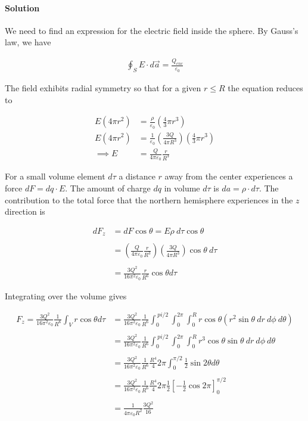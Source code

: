 \documentclass{article}
\begin{document}
\paragraph{Solution} We need to find an expression for the electric field inside the sphere. By Gauss's law, we have 

\begin{align*}
    \oint_S E\cdot d\vec{a} = \frac{Q_{enc}}{\varepsilon_0}
\end{align*}

The field exhibits radial symmetry so that for a given $r \leq R$ the equation reduces to 

\begin{align*}
    E(4\pi r^2) &= \frac{\rho}{\varepsilon_0}\left(\frac{4}{3}\pi r^3\right) \\
    E(4\pi r^2) &= \frac{1}{\varepsilon_0}\left(\frac{3Q}{4\pi R^3}\right)\left(\frac{4}{3}\pi r^3\right) \\
    \implies E &= \frac{Q}{4\pi\varepsilon_0}\frac{r}{R^3}
\end{align*}

For a small volume element $d\tau$ a distance $r$ away from the center experiences a force $dF = dq\cdot E$. The amount of charge $dq$ in volume $d\tau$ is $da = \rho\cdot d\tau$. The contribution to the total force that the northern hemisphere experiences in the $z$ direction is 

\begin{align*}
    dF_z &= dF\cos{\theta} = E\rho\ d\tau \cos{\theta} \\
    \\
    &= \left(\frac{Q}{4\pi\varepsilon_0}\frac{r}{R^3}\right)\left(\frac{3Q}{4\pi R^3}\right)\cos{\theta}\ d\tau\\
    \\
    &= \frac{3Q^2}{16\pi^2\varepsilon_0}\frac{r}{R^6}\cos{\theta}d\tau
\end{align*}

\pagebreak

Integrating over the volume gives 

\begin{align*}
    F_z = \frac{3Q^2}{16\pi^2\varepsilon_0}\frac{1}{R^6}\int_V r\cos{\theta}d\tau &= \frac{3Q^2}{16\pi^2\varepsilon_0}\frac{1}{R^6}\int_0^{\
    pi/2}\int_{0}^{2\pi}\int_0^R r\cos{\theta}(r^2\sin\theta\ dr\ d\phi\ d\theta) \\
    \\
    &= \frac{3Q^2}{16\pi^2\varepsilon_0}\frac{1}{R^6} \int_0^{\
    pi/2}\int_{0}^{2\pi}\int_0^R r^3\cos{\theta}\sin{\theta}\ dr\ d\phi \ d\theta\\
    \\
    &=\frac{3Q^2}{16\pi^2\varepsilon_0}\frac{1}{R^6}\frac{R^4}{4} 2\pi \int_0^{\pi/2}\frac{1}{2}\sin{2\theta} d\theta \\
    \\
    &= \frac{3Q^2}{16\pi^2\varepsilon_0}\frac{1}{R^6}\frac{R^4}{4} 2\pi \frac{1}{2}\left[-\frac{1}{2}\cos{2\pi}\right]^{\pi/2}_0\\
    \\
    &= \frac{1}{4\pi\varepsilon_0R^2}\frac{3Q^2}{16}
\end{align*}
\end{document}
